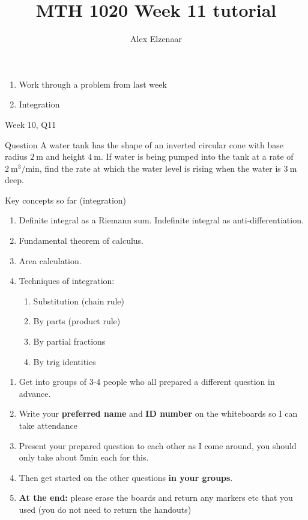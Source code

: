 \documentclass{beamer}
\title{MTH 1020 Week 11 tutorial}
\author{Alex Elzenaar}
\begin{document}
\begin{frame}{\inserttitle}
\begin{enumerate}
  \item Work through a problem from last week
  \item Integration
\end{enumerate}
\end{frame}


\begin{frame}{Week 10, Q11}
  \begin{block}{Question}
    A water tank has the shape of an inverted circular cone with base radius $2~\text{m}$ and height $4~\text{m}$. If water is being
    pumped into the tank at a rate of $2~\text{m}^3/\text{min}$, find the rate at which the water level is rising when the water is $3~\text{m}$
    deep.
  \end{block}
\end{frame}



\begin{frame}{Key concepts so far (integration)}
\begin{enumerate}
  \item Definite integral as a Riemann sum. Indefinite integral as anti-differentiation.
  \item Fundamental theorem of calculus.
  \item Area calculation.
  \item Techniques of integration:
    \begin{enumerate}
      \item Substitution (chain rule)
      \item By parts (product rule)
      \item By partial fractions
      \item By trig identities
    \end{enumerate}
\end{enumerate}
\end{frame}




\begin{frame}{\inserttitle}
\begin{enumerate}
  \item Get into groups of 3-4 people who all prepared a different question in advance.
  \item Write your \textbf{preferred name} and \textbf{ID number} on the whiteboards so I can take attendance
  \item Present your prepared question to each other as I come around, you should only take about 5min each for this.
  \item Then get started on the other questions \textbf{in your groups}.
  \item \textbf{At the end:} please erase the boards and return any markers etc that you used (you do not need to return the handouts)
\end{enumerate}
\end{frame}
\end{document}

